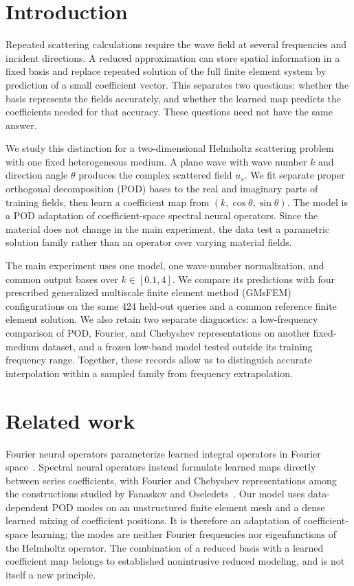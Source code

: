 
\section{Introduction}
Repeated scattering calculations require the wave field at several frequencies and incident directions. A reduced approximation can store spatial information in a fixed basis and replace repeated solution of the full finite element system by prediction of a small coefficient vector. This separates two questions: whether the basis represents the fields accurately, and whether the learned map predicts the coefficients needed for that accuracy. These questions need not have the same answer.

We study this distinction for a two-dimensional Helmholtz scattering problem with one fixed heterogeneous medium. A plane wave with wave number $k$ and direction angle $\theta$ produces the complex scattered field $u_s$. We fit separate proper orthogonal decomposition (POD) bases to the real and imaginary parts of training fields, then learn a coefficient map from $(k,\cos\theta,\sin\theta)$. The model is a POD adaptation of coefficient-space spectral neural operators. Since the material does not change in the main experiment, the data test a parametric solution family rather than an operator over varying material fields.

The main experiment uses one model, one wave-number normalization, and common output bases over $k\in[0.1,4]$. We compare its predictions with four prescribed generalized multiscale finite element method (GMsFEM) configurations on the same 424 held-out queries and a common reference finite element solution. We also retain two separate diagnostics: a low-frequency comparison of POD, Fourier, and Chebyshev representations on another fixed-medium dataset, and a frozen low-band model tested outside its training frequency range. Together, these records allow us to distinguish accurate interpolation within a sampled family from frequency extrapolation.

\section{Related work}
Fourier neural operators parameterize learned integral operators in Fourier space~\cite{li2020}. Spectral neural operators instead formulate learned maps directly between series coefficients, with Fourier and Chebyshev representations among the constructions studied by Fanaskov and Oseledets~\cite{fanaskov2022}. Our model uses data-dependent POD modes on an unstructured finite element mesh and a dense learned mixing of coefficient positions. It is therefore an adaptation of coefficient-space learning; the modes are neither Fourier frequencies nor eigenfunctions of the Helmholtz operator. The combination of a reduced basis with a learned coefficient map belongs to established nonintrusive reduced modeling, and is not itself a new principle.

